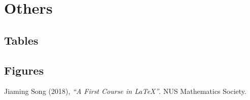 \documentclass{article}
\begin{document}
	\newpage
	\section{Others}
		\subsection{Tables}
			
		\subsection{Figures}
			
			
	\begin{thebibliography}{100}
		 Jiaming Song (2018), \emph{``A First Course in \LaTeX{}''}. NUS Mathematics Society.
	\end{thebibliography}
	
\end{document}
